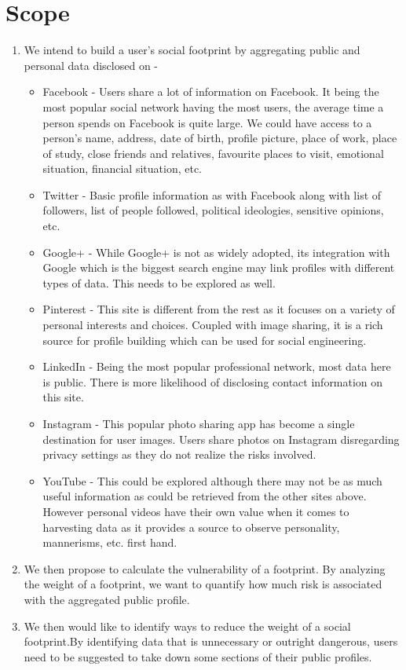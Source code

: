 \documentclass[11pt]{article}
\begin{document}
\section{Scope}
\begin{enumerate}

\item We intend to build a user’s social footprint by aggregating public and personal data disclosed on - 
  \begin{itemize}
   \item Facebook - Users share a lot of information on Facebook. It being the most popular social network having the most users, the average time a person spends on Facebook is quite large. We could have access to a person’s name, address, date of birth, profile picture, place 	of work, place of study, close friends and relatives, favourite places to visit, emotional situation, financial situation, etc. 
   \item Twitter - Basic profile information as with Facebook along with list of followers, list of people followed, political ideologies, sensitive opinions, etc.
   \item Google+ - While Google+ is not as widely adopted, its integration with Google which is the biggest search engine may link profiles with different types of data. This needs to be explored as well.
   \item Pinterest - This site is different from the rest as it focuses on a variety of personal interests and choices. Coupled with image sharing, it is a rich source for profile building which can be used for social engineering.
   \item LinkedIn - Being the most popular professional network, most data here is public. There is more likelihood of disclosing contact information on this site.
   \item Instagram - This popular photo sharing app has become a single destination for user images. Users share photos on Instagram disregarding privacy settings as they do not realize the risks involved.
   \item YouTube - This could be explored although there may not be as much useful information as could be retrieved from the other sites above. However personal videos have their own value when it comes to harvesting data as it provides a source to observe personality, mannerisms, etc. first hand.
    \end{itemize}

\item We then propose to calculate the vulnerability of a footprint. By analyzing the weight of a footprint, we want to quantify how much risk is associated with the aggregated public profile. 
\item We then would like to identify ways to reduce the weight of a social footprint.By identifying data that is unnecessary or outright dangerous, users need to be suggested to take down some sections of their public profiles.
\end{enumerate}
\end{document}

